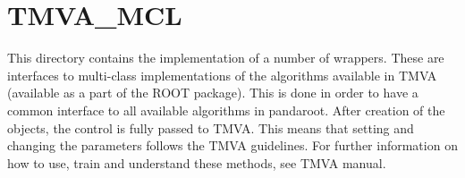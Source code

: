 \documentclass[twoside, a4paper, final]{article}
\begin{document}
\section{TMVA\_MCL}
This directory contains the implementation of a number of wrappers.
These are interfaces to multi-class implementations of the algorithms
available in TMVA (available as a part of the ROOT package). This is
done in order to have a common interface to all available algorithms
in pandaroot. After creation of the objects, the control is fully
passed to TMVA. This means that setting and changing the parameters
follows the TMVA guidelines. For further information on how to use,
train and understand these methods, see TMVA manual.
\end{document}
